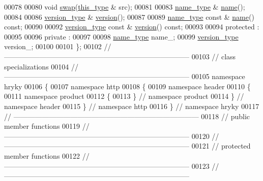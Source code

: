 \begin{DoxyCode}
00078 
00080     \textcolor{keywordtype}{void} \hyperlink{classhryky_1_1http_1_1header_1_1product_1_1_entity_ae6551a65c3ebd4478d4cdc4caa765b1d}{swap}(\hyperlink{classhryky_1_1http_1_1header_1_1product_1_1_entity}{this_type} & src);
00081 
00083     \hyperlink{classhryky_1_1_vector}{name_type} & \hyperlink{classhryky_1_1http_1_1header_1_1product_1_1_entity_a4622f084a0e038b350dda750eec6fa4e}{name}();
00084 
00086     \hyperlink{classhryky_1_1_vector}{version_type} & \hyperlink{classhryky_1_1http_1_1header_1_1product_1_1_entity_a7b712180b56c0feff152223d460c1800}{version}();
00087 
00089     \hyperlink{classhryky_1_1_vector}{name_type} \textcolor{keyword}{const} & \hyperlink{classhryky_1_1http_1_1header_1_1product_1_1_entity_a4622f084a0e038b350dda750eec6fa4e}{name}() \textcolor{keyword}{const};
00090 
00092     \hyperlink{classhryky_1_1_vector}{version_type} \textcolor{keyword}{const} & \hyperlink{classhryky_1_1http_1_1header_1_1product_1_1_entity_a7b712180b56c0feff152223d460c1800}{version}() \textcolor{keyword}{const};
00093 
00094 \textcolor{keyword}{protected} :
00095 
00096 \textcolor{keyword}{private} :
00097 
00098     \hyperlink{classhryky_1_1_vector}{name_type}       name\_;
00099     \hyperlink{classhryky_1_1_vector}{version_type}    version\_;
00100 
00101 \};
00102 \textcolor{comment}{//
      ------------------------------------------------------------------------------}
00103 \textcolor{comment}{// class specializations}
00104 \textcolor{comment}{//
      ------------------------------------------------------------------------------}
00105 \textcolor{keyword}{namespace }hryky
00106 \{
00107 \textcolor{keyword}{namespace }http
00108 \{
00109 \textcolor{keyword}{namespace }header
00110 \{
00111 \textcolor{keyword}{namespace }product
00112 \{
00113 \} \textcolor{comment}{// namespace product}
00114 \} \textcolor{comment}{// namespace header}
00115 \} \textcolor{comment}{// namespace http}
00116 \} \textcolor{comment}{// namespace hryky}
00117 \textcolor{comment}{//
      ------------------------------------------------------------------------------}
00118 \textcolor{comment}{// public member functions}
00119 \textcolor{comment}{//
      ------------------------------------------------------------------------------}
00120 \textcolor{comment}{//
      ------------------------------------------------------------------------------}
00121 \textcolor{comment}{// protected member functions}
00122 \textcolor{comment}{//
      ------------------------------------------------------------------------------}
00123 \textcolor{comment}{//
      ------------------------------------------------------------------------------}

\end{DoxyCode}
